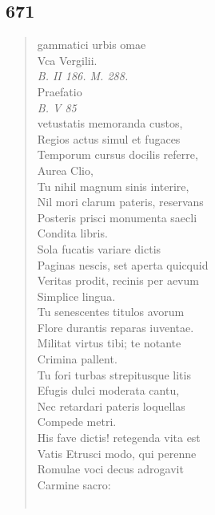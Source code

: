 \documentclass[11pt, a4paper]{report}
\begin{document}
            \subsection*{671}
      \begin{verse}
      gammatici urbis omae \\ Vca Vergilii. \\ \textit{B. II 186. M. 288.} \\ Praefatio \\ \textit{B. V 85} \\ vetustatis memoranda custos, \\ Regios actus simul et fugaces \\ Temporum cursus docilis referre, \\ Aurea Clio, \\ Tu nihil magnum sinis interire, \\ Nil mori clarum pateris, reservans \\ Posteris prisci monumenta saecli \\ Condita libris. \\ Sola fucatis variare dictis \\ Paginas nescis, set aperta quicquid \\ Veritas prodit, recinis per aevum \\ Simplice lingua. \\ Tu senescentes titulos avorum \\ Flore durantis reparas iuventae. \\ Militat virtus tibi; te notante \\ Crimina pallent. \\ Tu fori turbas strepitusque litis \\ Efugis dulci moderata cantu, \\ Nec retardari pateris loquellas \\ Compede metri. \\ His fave dictis! retegenda vita est \\ Vatis Etrusci modo, qui perenne \\ Romulae voci decus adrogavit \\ Carmine sacro: \\ 
        ﻿\pagebreak 

\end{verse}
\end{document}
